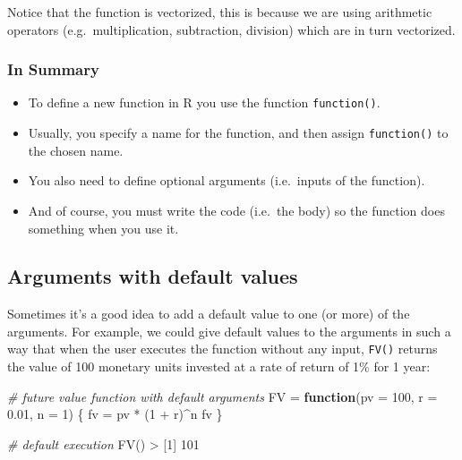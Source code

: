 \documentclass[
]{book}
\newenvironment{Shaded}{\begin{snugshade}}{\end{snugshade}}
\newcommand{\AttributeTok}[1]{\textcolor[rgb]{0.77,0.63,0.00}{#1}}
\newcommand{\CommentTok}[1]{\textcolor[rgb]{0.56,0.35,0.01}{\textit{#1}}}
\newcommand{\ControlFlowTok}[1]{\textcolor[rgb]{0.13,0.29,0.53}{\textbf{#1}}}
\newcommand{\DecValTok}[1]{\textcolor[rgb]{0.00,0.00,0.81}{#1}}
\newcommand{\FloatTok}[1]{\textcolor[rgb]{0.00,0.00,0.81}{#1}}
\newcommand{\FunctionTok}[1]{\textcolor[rgb]{0.00,0.00,0.00}{#1}}
\newcommand{\NormalTok}[1]{#1}
\newcommand{\OtherTok}[1]{\textcolor[rgb]{0.56,0.35,0.01}{#1}}
\newcommand{\SpecialCharTok}[1]{\textcolor[rgb]{0.00,0.00,0.00}{#1}}
\begin{document}
Notice that the function is vectorized, this is because we are using arithmetic
operators (e.g.~multiplication, subtraction, division) which are in turn
vectorized.

\hypertarget{in-summary}{%
\subsubsection*{In Summary}\label{in-summary}}

\begin{itemize}
\item
  To define a new function in R you use the function \texttt{function()}.
\item
  Usually, you specify a name for the function, and then assign \texttt{function()}
  to the chosen name.
\item
  You also need to define optional arguments (i.e.~inputs of the function).
\item
  And of course, you must write the code (i.e.~the body) so the function does
  something when you use it.
\end{itemize}

\hypertarget{arguments-with-default-values}{%
\subsection{Arguments with default values}\label{arguments-with-default-values}}

Sometimes it's a good idea to add a default value to one (or more) of the
arguments. For example, we could give default values to the arguments in such
a way that when the user executes the function without any input, \texttt{FV()}
returns the value of 100 monetary units invested at a rate of return of
1\% for 1 year:

\begin{Shaded}
\begin{Highlighting}[]
\CommentTok{\# future value function with default arguments}
\NormalTok{FV }\OtherTok{=} \ControlFlowTok{function}\NormalTok{(}\AttributeTok{pv =} \DecValTok{100}\NormalTok{, }\AttributeTok{r =} \FloatTok{0.01}\NormalTok{, }\AttributeTok{n =} \DecValTok{1}\NormalTok{) \{}
\NormalTok{  fv }\OtherTok{=}\NormalTok{ pv }\SpecialCharTok{*}\NormalTok{ (}\DecValTok{1} \SpecialCharTok{+}\NormalTok{ r)}\SpecialCharTok{\^{}}\NormalTok{n}
\NormalTok{  fv}
\NormalTok{\}}

\CommentTok{\# default execution}
\FunctionTok{FV}\NormalTok{()}
\SpecialCharTok{\textgreater{}}\NormalTok{ [}\DecValTok{1}\NormalTok{] }\DecValTok{101}
\end{Highlighting}
\end{Shaded}
\end{document}
